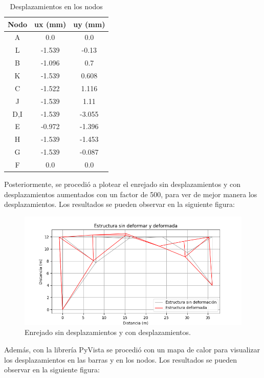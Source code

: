 \documentclass{article}  %
\begin{document}
\begin{table}[h!]
  \centering
  \begin{tabular}{ccc}
  \hline
  \textbf{Nodo} & \textbf{ux (mm)} & \textbf{uy (mm)} \\
  \hline
  A  & 0.0    & 0.0    \\
  L  & -1.539 & -0.13  \\
  B  & -1.096 & 0.7    \\
  K  & -1.539 & 0.608  \\
  C  & -1.522 & 1.116  \\
  J  & -1.539 & 1.11   \\
  D,I  & -1.539 & -3.055 \\
  E  & -0.972 & -1.396 \\
  H  & -1.539 & -1.453 \\
  G & -1.539 & -0.087 \\
  F & 0.0    & 0.0    \\
  \hline
  \end{tabular}
  \caption{Desplazamientos en los nodos}
\end{table}

\newpage
Posteriormente, se procedió a plotear el enrejado sin desplazamientos y con desplazamientos aumentados con un factor de 500, para ver de mejor manera los desplazamientos. Los resultados se pueden observar en la siguiente figura:
\begin{figure}[h]
  \centering
  \includegraphics[width=1\textwidth]{imagenes/E0_matplotlib.png}
  \caption{Enrejado sin desplazamientos y con desplazamientos.}
  \label{fig:1}
\end{figure}

\newpage
Además, con la librería PyVista se procedió con un mapa de calor para visualizar los desplazamientos en las barras y en los nodos. Los resultados se pueden observar en la siguiente figura:
\end{document}
